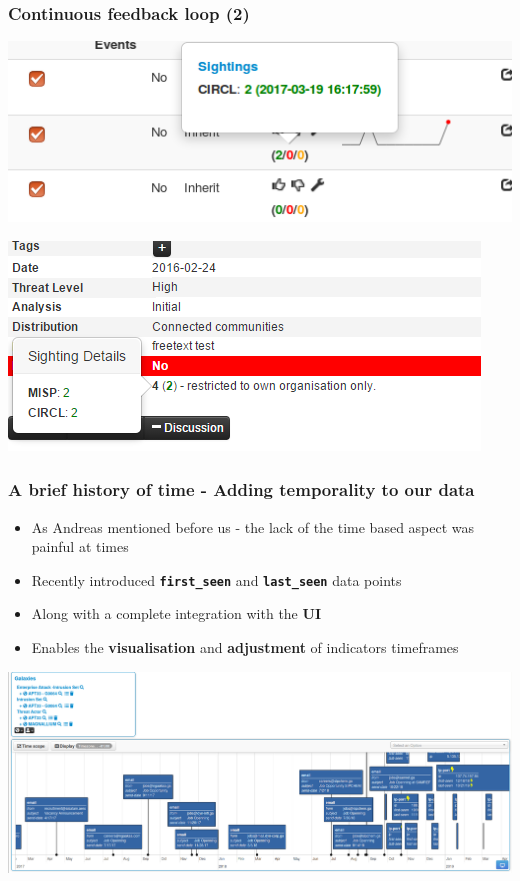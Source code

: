 \begin{frame}
  \frametitle{Continuous feedback loop (2)}
  \begin{center}
    \includegraphics[scale=0.5]{sighting-n.png}
  \end{center}
  \begin{center}
    \includegraphics[scale=0.60]{Sightings2.PNG}
  \end{center}  
\end{frame}

\begin{frame}
  \frametitle{A brief history of time - Adding temporality to our data}
  \begin{itemize}
    \item As Andreas mentioned before us - the lack of the time based aspect was painful at times
    \item Recently introduced {\bf \texttt{first\_seen}} and {\bf \texttt{last\_seen}} data points
    \item Along with a complete integration with the {\bf UI}
    \item Enables the {\bf visualisation} and {\bf adjustment} of indicators timeframes 
  \end{itemize}
  \begin{center}
    \includegraphics[width=1.0\linewidth]{timeline-misp-overview.png}
  \end{center}
\end{frame}

